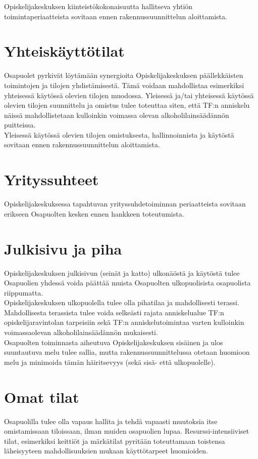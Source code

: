 \documentclass[a4paper, 12pt, finnish]{report}
\begin{document}
Opiskelijakeskuksen kiinteistökokonaisuutta hallitseva yhtiön toimintaperiaatteista sovitaan ennen rakennussuunnittelun aloittamista.


\section*{Yhteiskäyttötilat}
Osapuolet pyrkivät löytämään synergioita Opiskelijakeskuksen päällekkäisten toimintojen ja tilojen yhdistämisestä.
Tämä voidaan mahdollistaa esimerkiksi yhteisessä käytössä olevien tilojen muodossa.
Yleisessä ja/tai yhteisessä käytössä olevien tilojen suunnittelu ja omistus tulee toteuttaa siten, että TF:n anniskelu näissä mahdollistetaan kulloinkin voimassa olevan alkoholilainsäädännön puitteissa.\\

Yleisessä käytössä olevien tilojen omistuksesta, hallinnoinnista ja käytöstä sovitaan ennen rakennussuunnittelun aloittamista.

\section*{Yrityssuhteet}
Opiskelijakeskuksessa tapahtuvan yrityssuhdetoiminnan periaatteista sovitaan erikseen Osapuolten kesken ennen hankkeen toteutumista.


\section*{Julkisivu ja piha}
Opiskelijakeskuksen julkisivun (seinät ja katto) ulkonäöstä ja käytöstä tulee Osapuolien yhdessä voida päättää muista Osapuolten ulkopuolisista osapuolista riippumatta.\\

Opiskelijakeskuksen ulkopuolella tulee olla pihatilaa ja mahdollisesti terassi.
Mahdollisesta terassista tulee voida selkeästi rajata anniskelualue TF:n opiskelijaravintolan tarpeisiin sekä TF:n anniskelutoimintaa varten kulloinkin voimassaolevan alkoholilainsäädännön mukaisesti.\\

Osapuolten toiminnasta aiheutuva Opiskelijakeskuksen sisäinen ja ulos suuntautuva melu tulee sallia, mutta rakennussuunnittelussa otetaan huomioon melu ja minimoida tämän häiritsevyys (sekä sisä- että ulkopuolelle).


\section*{Omat tilat}
Osapuolilla tulee olla vapaus hallita ja tehdä vapaasti muutoksia itse omistamissaan tiloissaan, ilman muiden osapuolien lupaa.
Resurssi-intensiiviset tilat, esimerkiksi keittiöt ja märkätilat pyritään toteuttamaan toistensa läheisyyteen mahdollisuuksien mukaan käyttötarpeet huomioiden.
\end{document}
